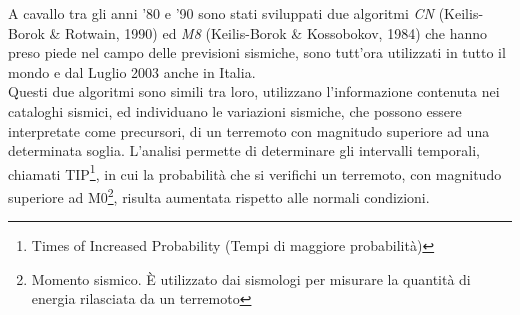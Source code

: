 A cavallo tra gli anni '80 e '90 sono stati sviluppati due algoritmi \textit{CN} (Keilis-Borok \& Rotwain, 1990) ed \textit{M8} (Keilis-Borok \& Kossobokov, 1984) che hanno preso piede nel campo delle previsioni sismiche, sono tutt'ora utilizzati in tutto il mondo e dal Luglio 2003 anche in Italia.\\
Questi due algoritmi sono simili tra loro, utilizzano l'informazione contenuta nei cataloghi sismici, ed individuano le variazioni sismiche, che possono essere interpretate come precursori, di un terremoto con magnitudo superiore ad una determinata soglia. L'analisi permette di determinare gli intervalli temporali, chiamati TIP\footnote{Times of Increased Probability (Tempi di maggiore probabilit\`a)}, in cui la probabilit\`a che si verifichi un terremoto, con magnitudo superiore ad M0\footnote{Momento sismico. \`E utilizzato dai sismologi per misurare la quantit\`a di energia rilasciata da un terremoto}, risulta aumentata rispetto alle normali condizioni.\\

